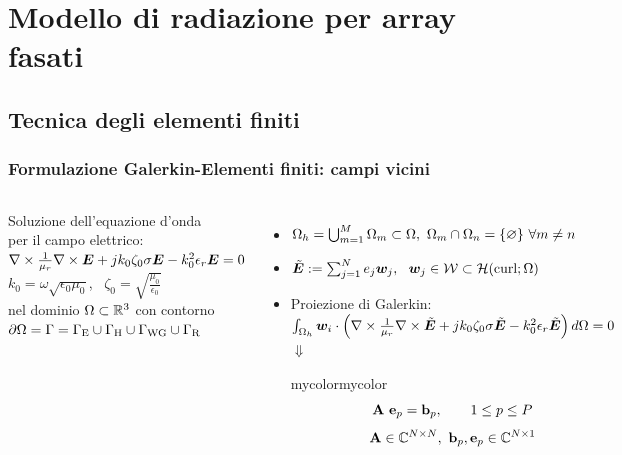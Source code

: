 \documentclass[11pt]{beamer}
\begin{document}
\section{Modello di radiazione per array fasati}
\subsection{Tecnica degli elementi finiti}
\frame
{
  \frametitle{Formulazione Galerkin-Elementi finiti: campi vicini}
\scriptsize
\begin{columns}[c]
\column{7cm}
\centering
Soluzione dell'\alert{equazione d'onda\\ per il campo elettrico}: \\[.2cm]
\alert{$\nabla \times \frac{1}{\mu_r} \nabla \times \mbfit{E} + jk_0\zeta_0\sigma \mbfit{E}  - k_0^2\epsilon_r \mbfit{E} = 0$} \\ $k_0 = \omega \sqrt{\epsilon_0 \mu_0}$, \ $\zeta_0 = \sqrt{\frac{\mu_0}{\epsilon_0}}$ \\[0.2cm]
nel dominio $\mathrm{\Omega} \subset \mathbb{R}^3$ con contorno \\ $\mathrm{\partial \Omega = \Gamma = \Gamma_E \cup \Gamma_{H} \cup \Gamma_{WG} \cup \Gamma_R}$ \\[.2cm] \pause
\begin{itemize}
 \item $\mathrm{\Omega}_h = \bigcup_{m=1}^{M} \mathrm{\Omega}_m \subset \mathrm{\Omega}, \ \mathrm{\Omega}_m \cap \mathrm{\Omega}_n = \{ \varnothing \} \ \forall m \neq n $ \pause
 \item $\tilde{\mbfit{E}} := \sum_{j=1}^N e_j \mbfit{w}_j, \ \ \mbfit{w}_j \in \mathcal{W} \subset \mathcal{H}(\mrm{curl;\mrm{\Omega}})$ \pause
 \item Proiezione di Galerkin:%
\\[.1cm] \hspace{-.8cm}
 $\int_{\mrm{\Omega}_h} \mbfit{w}_i \cdot \left ( \nabla \times \frac{1}{\mu_r} \nabla \times \tilde{\mbfit{E}} + jk_0\zeta_0\sigma \tilde{\mbfit{E}}  - k_0^2\epsilon_r \tilde{\mbfit{E}} \right ) d\mrm{\Omega} = 0$ \\ \pause
\centering
\hspace{-1cm} $\Downarrow$ \\
\hspace{-1cm}
\begin{colorblock}{mycolor}{mycolor}{}
\normalsize $$\mat{A} \ \vect{e}_p  = \vect{b}_p, \qquad 1 \leq p \leq P$$
$$ \mat A \in \mathbb{C}^{N \times N}, \ \vect{b}_p, \vect{e}_p \in \mathbb{C}^{N \times 1}$$

\end{colorblock}
\end{itemize}
\end{columns}}
\end{document}
